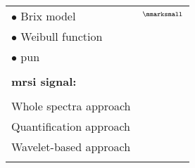 \begin{longtable}{@{}l >{\raggedleft\arraybackslash}X@{}}
  \quad \quad $\bullet$ Brix model & $^{\text{{\mmarksmall}}}$\cite{Artan2009,Artan2010,Ozer2009,Ozer2010} \cite{Liu2009,Sung2011} \\
  \quad \quad $\bullet$ Weibull function & \cite{Giannini2013,Mazzetti2011,giannini2015fully} \\
  \quad \quad $\bullet$ \acs*{pun} & \cite{Giannini2013,Mazzetti2011,giannini2015fully} \\ \\ [-1.5ex]
  \textbf{\acs*{mrsi} signal:} & \\ \\ [-1.5ex]
  \quad Whole spectra approach & \cite{Kelm2007,Matulewicz2013,Parfait2012,Tiwari2007,Tiwari2008,Tiwari2009,Tiwari2009a,Tiwari2010,Tiwari2013,Viswanath2008} \\
  \quad Quantification approach & \cite{Kelm2007,Parfait2012,trigui2016classification,trigui2017automatic} \\
  \quad Wavelet-based approach & \cite{Tiwari2012} \\
  \bottomrule
  \label{tab:feat}
\end{longtable}

